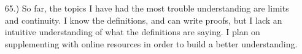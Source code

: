 \documentclass[12pt]{article}
\newcommand{\vertb}[1]{\left\vert#1\right\vert}
\newcommand{\e}{\varepsilon}
\begin{document}
\begin{itemize}











    \item [65.)] So far, the topics I have had the most trouble understanding are limits and continuity. I know the definitions, and can write proofs, but I lack an intuitive understanding of what the definitions are saying. I plan on supplementing with online resources in order to build a better understanding.


\end{itemize}
\end{document}
